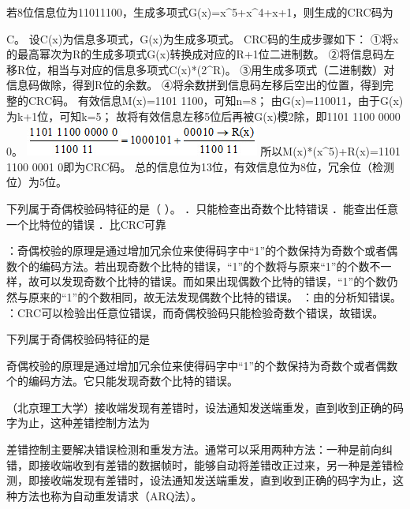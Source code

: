 \question 若8位信息位为11011100，生成多项式G(x)=x\^{}5+x\^{}4+x+1，则生成的CRC码为
\par{}
\begin{solution}C。 设C(x)为信息多项式，G(x)为生成多项式。 CRC码的生成步骤如下：
①将x的最高幂次为R的生成多项式G(x)转换成对应的R+1位二进制数。
②将信息码左移R位，相当与对应的信息多项式C(x)*(2\^{}R)。
③用生成多项式（二进制数）对信息码做除，得到R位的余数。
④将余数拼到信息码左移后空出的位置，得到完整的CRC码。 有效信息M(x)=1101
1100，可知n=8； 由G(x)=110011，由于G(x)为k+1位，可知k=5；
故将有效信息左移5位后再被G(x)模2除，即1101 1100 0000 0。
\includegraphics[width=3.04167in,height=0.41667in]{computerassets/37425042f260ca5a3767b94bc041794b.jpeg}
所以M(x)*(x\^{}5)+R(x)=1101 1100 0001 0即为CRC码。
总的信息位为13位，有效信息位为8位，冗余位（检测位）为5位。
\end{solution}
\question 下列属于奇偶校验码特征的是（ ）。 ．只能检查出奇数个比特错误
．能查出任意一个比特位的错误 ．比CRC可靠
\par{}
\begin{solution}：奇偶校验的原理是通过增加冗余位来使得码字中``1''的个数保持为奇数个或者偶数个的编码方法。若出现奇数个比特的错误，``1''的个数将与原来``1''的个数不一样，故可以发现奇数个比特的错误。而如果出现偶数个比特的错误，``1''的个数仍然与原来的``1''的个数相同，故无法发现偶数个比特的错误。
：由的分析知错误。
：CRC可以检验出任意位错误，而奇偶校验码只能检验奇数个错误，故错误。
\end{solution}
\question 下列属于奇偶校验码特征的是
\par{}
\begin{solution}奇偶校验的原理是通过增加冗余位来使得码字中``1''的个数保持为奇数个或者偶数个的编码方法。它只能发现奇数个比特的错误。
\end{solution}
\question （北京理工大学）接收端发现有差错时，设法通知发送端重发，直到收到正确的码字为止，这种差错控制方法为
\par{}
\begin{solution}差错控制主要解决错误检测和重发方法。通常可以采用两种方法：一种是前向纠错，即接收端收到有差错的数据帧时，能够自动将差错改正过来，另一种是差错检测，即接收端发现有差错时，设法通知发送端重发，直到收到正确的码字为止，这种方法也称为自动重发请求（ARQ法）。
\end{solution}
